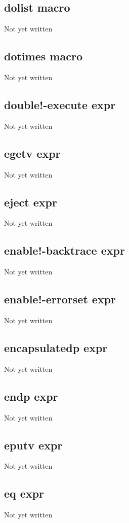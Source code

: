 \documentclass[a4paper,11pt]{article}
\begin{document}
{\subsection{\ttfamily dolist macro}
   Not yet written

\subsection{\ttfamily dotimes macro}
   Not yet written

\subsection{\ttfamily double!-execute expr}
   Not yet written

\subsection{\ttfamily egetv expr}
   Not yet written

\subsection{\ttfamily eject expr}
   Not yet written

\subsection{\ttfamily enable!-backtrace expr}
   Not yet written

\subsection{\ttfamily enable!-errorset expr}
   Not yet written

\subsection{\ttfamily encapsulatedp expr}
   Not yet written

\subsection{\ttfamily endp expr}
   Not yet written

\subsection{\ttfamily eputv expr}
   Not yet written

\subsection{\ttfamily eq expr}
   Not yet written

}
\end{document}
